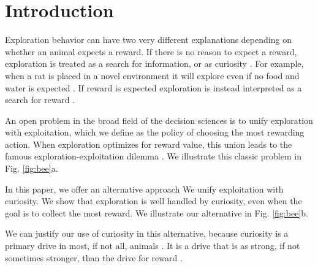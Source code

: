 \section*{Introduction}
Exploration behavior can have two very different explanations depending on whether an animal expects a reward. If there is no reason to expect a reward, exploration is treated as a search for information, or as curiosity \cite{Berlyne1950,Schmidhuber1991,Kidd2015,Jaegle2019,Sumner2019,Wang2019,Auersperg2015}. For example, when a rat is placed in a novel environment it will explore even if no food and water is expected \cite{Berlyne1950,Rosenberg2021}. If reward is expected exploration is instead interpreted as a search for reward \cite{Gupta2006,Sutton2018,Woodgate2017,Lee2011a,Schulz2018a,Calhoun2014}. 

An open problem in the broad field of the decision sciences is to unify exploration with exploitation, which we define as the policy of choosing the most rewarding action. When exploration optimizes for reward value, this union leads to the famous exploration-exploitation dilemma \cite{Kelly1956,Berger-Tal2014,Dayan1996,Thrun1992,Mehlhorn2015,Kobayashi2019}. We illustrate this classic problem in Fig. \ref{fig:bee}a.

In this paper, we offer an alternative approach We unify exploitation with curiosity. We show that exploration is well handled by curiosity, even when the goal is to collect the most reward. We illustrate our alternative in Fig. \ref{fig:bee}b. 

We can justify our use of curiosity in this alternative, because curiosity is a primary drive in most, if not all, animals \cite{Berlyne1950,Loewenstein1994,Inglis2001}. It is a drive that is as strong, if not sometimes stronger, than the drive for reward \cite{Loewenstein1994,Kidd2015,Gottlieb2018,Sumner2019,Gopnik2020,Song2019,Wang2019}. 

